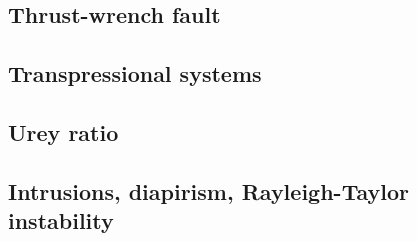 \subsection{Thrust-wrench fault} 

{\scriptsize
\noindent
\cite{rods15}
}

\subsection{Transpressional systems} 

{\scriptsize
\noindent
\cite{tite94}
\cite{thsj97}
\cite{konc03}\cite{upke03}
\cite{legs11}
\cite{naam17}\cite{rugb17}
\cite{naam18}
}

\subsection{Urey ratio}

{\scriptsize
\cite{kore08}
\cite{nata12} 
}

\subsection{Intrusions, diapirism, Rayleigh-Taylor instability}


